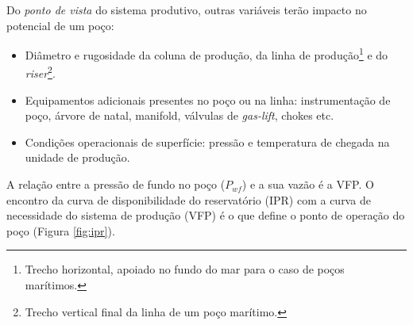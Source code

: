 \documentclass[final,5p]{elsarticle}
\numberwithin{equation}{section}
\begin{document}
        Do \emph{ponto de vista} do sistema produtivo, outras variáveis terão impacto no potencial de um poço:

        \begin{itemize}
            \item Diâmetro e rugosidade da coluna de produção, da linha de produção\footnote{Trecho horizontal, apoiado no fundo do mar para o caso de poços marítimos.} e do \emph{riser}\footnote{Trecho vertical final da linha de um poço marítimo.}.
            \item Equipamentos adicionais presentes no poço ou na linha: instrumentação de poço, árvore de natal, manifold, válvulas de \emph{gas-lift}, chokes etc.
            \item  Condições operacionais de superfície: pressão e temperatura de chegada na unidade de produção.
        \end{itemize}

        A relação entre a pressão de fundo no poço ($P_{wf}$) e a sua vazão é a VFP. O encontro da curva de disponibilidade do reservatório (IPR) com a curva de necessidade do sistema de produção (VFP) é o que define o ponto de operação do poço (Figura \ref{fig:ipr}).
        
\end{document}
